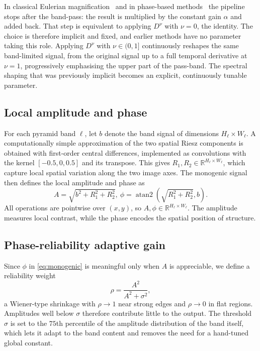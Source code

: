 \documentclass[conference]{IEEEtran}
\begin{document}
In classical Eulerian magnification~\cite{wu2012} and in phase-based
methods~\cite{wadhwa2013,wadhwa2014} the pipeline stops after the band-pass:
the result is multiplied by the constant gain $\alpha$ and added back. That
step is equivalent to applying $D^{\nu}$ with $\nu=0$, the identity. The
choice is therefore implicit and fixed, and earlier methods have no parameter
taking this role. Applying $D^{\nu}$ with $\nu \in (0,1]$ continuously
reshapes the same band-limited signal, from the original signal up to a full
temporal derivative at $\nu=1$, progressively emphasising the upper part of
the pass-band. The spectral shaping that was previously implicit becomes an
explicit, continuously tunable parameter.

\subsection{Local amplitude and phase}

For each pyramid band $\ell$, let $b$ denote the band signal of dimensions
$H_\ell \times W_\ell$. A computationally simple approximation of the two
spatial Riesz components is obtained with first-order central differences,
implemented as convolutions with the kernel $[-0.5,0,0.5]$ and its transpose.
This gives $R_1,R_2\in\mathbb{R}^{H_\ell\times W_\ell}$, which capture
local spatial variation along the two image axes. The monogenic
signal~\cite{felsberg2001} then defines the local amplitude and phase as
\begin{equation}
A = \sqrt{b^2 + R_1^2 + R_2^2}, \
\phi = \operatorname{atan2}\left(
\sqrt{R_1^2+R_2^2},b\right).
\label{eq:monogenic}
\end{equation}
All operations are pointwise over $(x,y)$, so
$A,\phi\in\mathbb{R}^{H_\ell\times W_\ell}$. The amplitude measures local
contrast, while the phase encodes the spatial position of structure.

\subsection{Phase-reliability adaptive gain}

Since $\phi$ in \eqref{eq:monogenic} is meaningful only when $A$ is
appreciable, we define a reliability weight
\begin{equation}
\rho = \frac{A^2}{A^2 + \sigma^2},
\label{eq:rho}
\end{equation}
a Wiener-type shrinkage with $\rho \to 1$ near strong edges and
$\rho \to 0$ in flat regions. Amplitudes well below $\sigma$ therefore
contribute little to the output. The threshold $\sigma$ is set to the
$75$th percentile of the amplitude distribution of the band itself, which
lets it adapt to the band content and removes the need for a hand-tuned
global constant.
\end{document}
